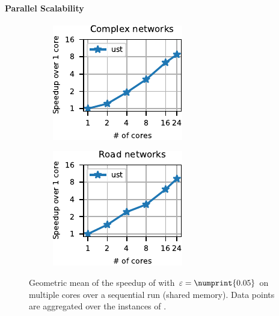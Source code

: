 \paragraph{Parallel Scalability}
\begin{figure}[tb]
\centering
\begin{subfigure}[t]{.45\textwidth}
\centering
\includegraphics[width=.7\textwidth]{sources/plots/el-clos/parallel-scalability-forest-cplx.pdf}
\end{subfigure}\hfill
\begin{subfigure}[t]{.45\textwidth}
\centering
\includegraphics[width=.7\textwidth]{sources/plots/el-clos/parallel-scalability-forest-road.pdf}
\end{subfigure}
\caption{Geometric mean of the speedup of \ust with $\epsilon = \numprint{0.05}$
on multiple cores over a sequential run (shared memory).
Data points are aggregated over the instances of .}
\label{fig:el-clos:forest-par-scal}
\end{figure}

